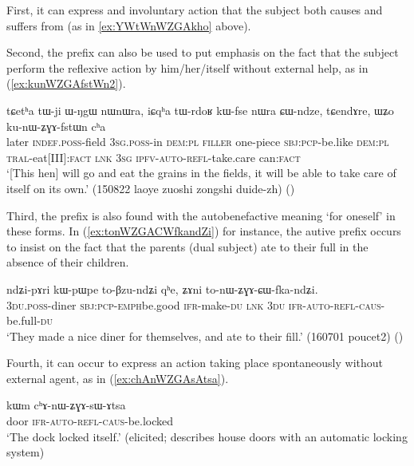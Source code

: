 First, it can express and involuntary action that the subject both causes and suffers from (as in \ref{ex:YWtWnWZGAkho} above).

Second, the  prefix can also be used to put emphasis on the fact that the subject perform the reflexive action by him/her/itself without external help, as in (\ref{ex:kunWZGAfstWn2}).

\begin{exe}
\ex \label{ex:kunWZGAfstWn2}
\gll  tɕetʰa tɯ-ji ɯ-ŋgɯ nɯnɯra, iɕqʰa tɯ-rdoʁ kɯ-fse nɯra ɕɯ-ndze, tɕendɤre, ɯʑo ku-nɯ-ʑɣɤ-fstɯn cʰa   \\
later \textsc{indef}.\textsc{poss}-field \textsc{3sg}.\textsc{poss}-in \textsc{dem}:\textsc{pl} \textsc{filler} one-piece \textsc{sbj}:\textsc{pcp}-be.like \textsc{dem}:\textsc{pl} \textsc{tral}-eat[III]:\textsc{fact} \textsc{lnk} \textsc{3sg} \textsc{ipfv}-\textsc{auto}-\textsc{refl}-take.care can:\textsc{fact}   \\
\glt `[This hen] will go and eat the grains in the fields, it will be able to take care of itself on its own.' (150822 laoye zuoshi zongshi duide-zh)
()
\end{exe} 

Third, the  prefix is also found with the autobenefactive meaning `for oneself' in these forms. In (\ref{ex:tonWZGACWfkandZi}) for instance, the autive prefix occurs to insist on the fact that the parents (dual subject) ate to their full in the absence of their children.

\begin{exe}
\ex \label{ex:tonWZGACWfkandZi}
\gll ndʑi-pɤri kɯ-pɯ\redp{}pe to-βzu-ndʑi qʰe, ʑɤni to-nɯ-ʑɣɤ-ɕɯ-fka-ndʑi. \\
\textsc{3du}.\textsc{poss}-diner \textsc{sbj}:\textsc{pcp}-\textsc{emph}\redp{}be.good \textsc{ifr}-make-\textsc{du} \textsc{lnk} \textsc{3du} \textsc{ifr}-\textsc{auto}-\textsc{refl}-\textsc{caus}-be.full-\textsc{du} \\
\glt `They made a nice diner for themselves, and ate to their fill.' (160701 poucet2) ()
\end{exe}

Fourth, it can occur to express an action taking place spontaneously without external agent, as in (\ref{ex:chAnWZGAsAtsa}).

\begin{exe}
\ex \label{ex:chAnWZGAsAtsa}
\gll  kɯm cʰɤ-nɯ-ʑɣɤ-sɯ-ɤtsa \\
door \textsc{ifr}-\textsc{auto}-\textsc{refl}-\textsc{caus}-be.locked \\
\glt `The dock locked itself.' (elicited; describes house doors with an automatic locking system)
\end{exe}


